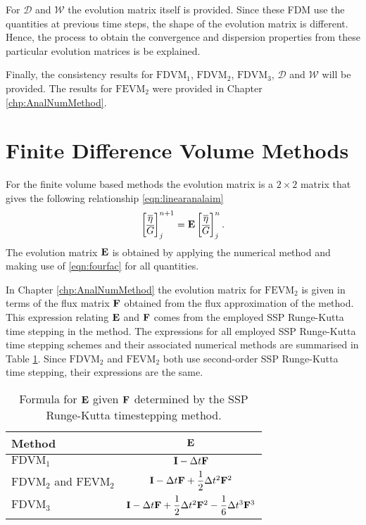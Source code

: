 For $\mathcal{D}$ and $\mathcal{W}$ the evolution matrix itself is provided. Since these FDM use the quantities at previous time steps, the shape of the evolution matrix is different. Hence, the process to obtain the convergence and dispersion properties from these particular evolution matrices is be explained. 

Finally, the consistency results for $\text{FDVM}_1$, $\text{FDVM}_2$, $\text{FDVM}_3$, $\mathcal{D}$ and $\mathcal{W}$ will be provided. The results for $\text{FEVM}_2$ were provided in Chapter \ref{chp:AnalNumMethod}.  


\section{Finite Difference Volume Methods}
For the finite volume based methods the evolution matrix is a $2\times2$ matrix that gives the following relationship \eqref{eqn:linearanalaim}
\begin{equation}
\label{eqn:AppDEFDVM}
\begin{bmatrix}
\overline{\eta} \\\overline{G} 
\end{bmatrix}^{n+1}_j = \mathbf{E} \begin{bmatrix}
\overline{\eta} \\\overline{G}
\end{bmatrix}^{n}_j.
\end{equation}
The evolution matrix $\mathbf{E}$ is obtained by applying the numerical method and making use of \eqref{eqn:fourfac} for all quantities.

In Chapter \ref{chp:AnalNumMethod} the evolution matrix for $\text{FEVM}_2$ is given in terms of the flux matrix $\mathbf{F}$ obtained from the flux approximation of the method. This expression relating $\mathbf{E}$ and $\mathbf{F}$ comes from the employed SSP Runge-Kutta time stepping in the method. The expressions for all employed SSP Runge-Kutta time stepping schemes and their associated numerical methods are summarised in Table \ref{tab:RKstepfactor}. Since $\text{FDVM}_2$ and $\text{FEVM}_2$ both use second-order SSP Runge-Kutta time stepping, their expressions are the same.  

\begin{table}
	\centering
	\begin{tabular}{l  c}
		Method & $\mathbf{E}$  \T\B \\
		\hline 
		$\text{FDVM}_1$& $\mathbf{I} - \Delta t\mathbf{F} $  \T\B \\
		$\text{FDVM}_2$ and $\text{FEVM}_2$ & $ \mathbf{I}  -\Delta t\mathbf{F} + \dfrac{1}{2}\Delta t^2\mathbf{F}^2$  \T\B \\
		$\text{FDVM}_3$& $\mathbf{I} -\Delta t\mathbf{F} + \dfrac{1}{2}\Delta t^2 \mathbf{F}^2 - \dfrac{1}{6}\Delta t^3 \mathbf{F}^3 $  \T\B \\
		\hline
	\end{tabular}
	\caption{Formula for $\mathbf{E}$ given $\mathbf{F}$ determined by the SSP Runge-Kutta timestepping method.}
	\label{tab:RKstepfactor}
\end{table}


